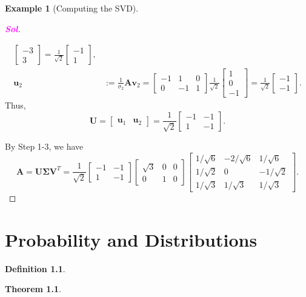 \documentclass[12pt,openany]{book}
\newtheorem{theorem}{Theorem}[chapter]
\theoremstyle{definition}
\newtheorem{definition}{Definition}[chapter]
\newtheorem{example}{Example}[chapter]
\newcommand{\sol}{\textcolor{magenta}{\bf Sol}}
\renewcommand{\vec}[1]{\textbf{#1}}
\begin{document}
\begin{example}[Computing the SVD]
\begin{proof}[\sol]
\begin{enumerate}[(Step 1)]
\begin{align*}
\begin{bmatrix}
			-3\\3
		\end{bmatrix}=\frac{1}{\sqrt{2}}\begin{bmatrix}
		-1\\1
	\end{bmatrix},\\
			\vec{u}_2&:=\frac{1}{\sigma_2}\textbf{A}\vec{v}_2=\begin{bmatrix}
				-1 & 1 & 0\\
				0 & -1 & 1
			\end{bmatrix}\frac{1}{\sqrt{2}}\begin{bmatrix}
				1\\0\\-1
			\end{bmatrix}=\frac{1}{\sqrt{2}}\begin{bmatrix}
				-1\\-1
			\end{bmatrix}.
			\end{align*} Thus, \[
			\textbf{U}=\begin{bmatrix}
				\vec{u}_1&\vec{u}_2
			\end{bmatrix}=\frac{1}{\sqrt{2}}\begin{bmatrix}
			-1&-1\\1&-1
		\end{bmatrix}.
			\]
			\end{enumerate}
			By Step 1-3, we have \[
			\textbf{A}=\textbf{U}\boldsymbol{\Sigma}\textbf{V}^T=\frac{1}{\sqrt{2}}\begin{bmatrix}
				-1&-1\\1&-1
			\end{bmatrix}\begin{bmatrix}
			\sqrt{3} & 0 & 0\\
			0 & 1 & 0
		\end{bmatrix}\begin{bmatrix}
		1/\sqrt{6} & -2/\sqrt{6} & 1/\sqrt{6}\\
		1/\sqrt{2} & 0 & -1/\sqrt{2}\\
		1/\sqrt{3} & 1/\sqrt{3} & 1/\sqrt{3}
	\end{bmatrix}.
			\]
		\end{proof}
	\end{example}
	
	\newpage
	\chapter{Probability and Distributions}
	
	\begin{tcolorbox}[colframe=defcolor,title={\color{white}\bf }]
		\begin{definition}
			
		\end{definition}
	\end{tcolorbox}
	\begin{tcolorbox}[colframe=thmcolor,title={\color{white}\bf }]
		\begin{theorem}
			
		\end{theorem}
	\end{tcolorbox}
	
\end{document}
